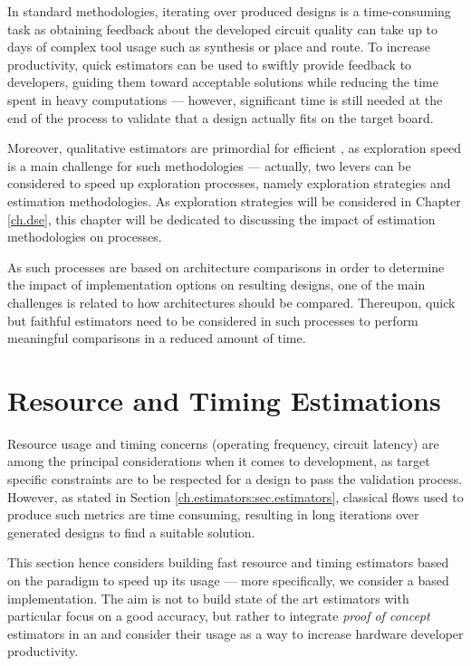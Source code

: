         In standard  methodologies, iterating over produced designs is a time-consuming task as obtaining feedback about the developed circuit quality can take up to days of complex tool usage such as synthesis or place and route.
        To increase productivity, quick estimators can be used to swiftly provide feedback to developers, guiding them toward acceptable solutions while reducing the time spent in heavy computations --- however, significant time is still needed at the end of the process to validate that a design actually fits on the target board.
        
        Moreover, qualitative estimators are primordial for efficient , as exploration speed is a main challenge for such methodologies --- actually, two levers can be considered to speed up exploration processes, namely exploration strategies and estimation methodologies.
        As exploration strategies will be considered in Chapter \ref{ch.dse}, this chapter will be dedicated to discussing the impact of estimation methodologies on  processes.

        As such processes are based on architecture comparisons in order to determine the impact of implementation options on resulting designs, one of the main challenges is related to how architectures should be compared.
        Thereupon, quick but faithful estimators need to be considered in such processes to perform meaningful comparisons in a reduced amount of time. 


\section{Resource and Timing Estimations}
\label{ch.estimators:sec.resource-timing}

    Resource usage and timing concerns (\eg operating frequency, circuit latency) are among the principal considerations when it comes to  development, as target specific constraints are to be respected for a design to pass the validation process.
    However, as stated in Section \ref{ch.estimators:sec.estimators}, classical flows used to produce such metrics are time consuming, resulting in long iterations over generated designs to find a suitable solution.

    This section hence considers building fast resource and timing estimators based on the  paradigm to speed up its usage --- more specifically, we consider a \chisel{} based implementation.
    The aim is not to build state of the art estimators with particular focus on a good accuracy, but rather to integrate {\it proof of concept} estimators in an  and consider their usage as a way to increase hardware developer productivity.


